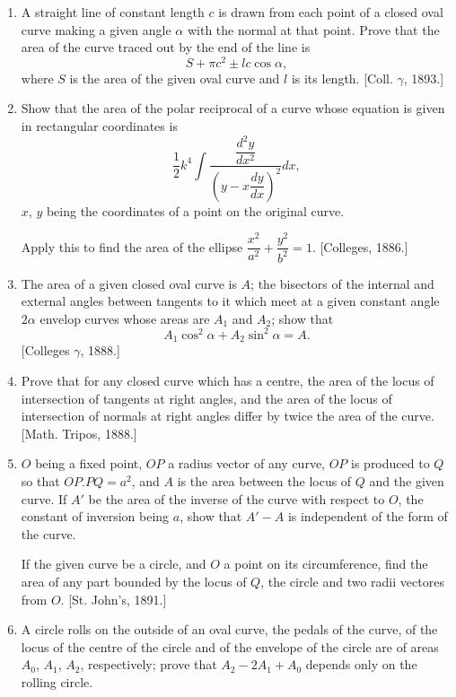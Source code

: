\documentclass[11pt, a4paper]{article}
\newcommand{\source}[1]{\hfill\textnormal{[#1]}}
\begin{document}
\begin{enumerate}[leftmargin=2em]
\item A straight line of constant length $c$ is drawn from each point of a closed oval curve making a given angle $\alpha$ with the normal at that point. Prove that the area of the curve traced out by the end of the line is
\[
S+\pi c^2\pm lc\cos\alpha,
\]
where $S$ is the area of the given oval curve and $l$ is its length. \source{Coll. $\gamma$, 1893.}

\item Show that the area of the polar reciprocal of a curve whose equation is given in rectangular coordinates is
\[
\frac12k^4\int\frac{\dfrac{d^2y}{dx^2}}{\left(y-x\dfrac{dy}{dx}\right)^2}dx,
\]
$x$, $y$ being the coordinates of a point on the original curve.

Apply this to find the area of the ellipse $\dfrac{x^2}{a^2}+\dfrac{y^2}{b^2}=1$. \source{Colleges, 1886.}

\item The area of a given closed oval curve is $A$; the bisectors of the internal and external angles between tangents to it which meet at a given constant angle $2\alpha$ envelop curves whose areas are $A_1$ and $A_2$; show that
\[
A_1\cos^2\alpha+A_2\sin^2\alpha=A.
\]
\source{Colleges $\gamma$, 1888.}

\item Prove that for any closed curve which has a centre, the area of the locus of intersection of tangents at right angles, and the area of the locus of intersection of normals at right angles differ by twice the area of the curve. \source{Math. Tripos, 1888.}

\item $O$ being a fixed point, $OP$ a radius vector of any curve, $OP$ is produced to $Q$ so that $OP.PQ=a^2$, and $A$ is the area between the locus of $Q$ and the given curve. If $A'$ be the area of the inverse of the curve with respect to $O$, the constant of inversion being $a$, show that $A'-A$ is independent of the form of the curve.

If the given curve be a circle, and $O$ a point on its circumference, find the area of any part bounded by the locus of $Q$, the circle and two radii vectores from $O$. \source{St. John's, 1891.}

\item A circle rolls on the outside of an oval curve, the pedals of the curve, of the locus of the centre of the circle and of the envelope of the circle are of areas $A_0$, $A_1$, $A_2$, respectively; prove that $A_2-2A_1+A_0$ depends only on the rolling circle.


\end{enumerate}
\end{document}

